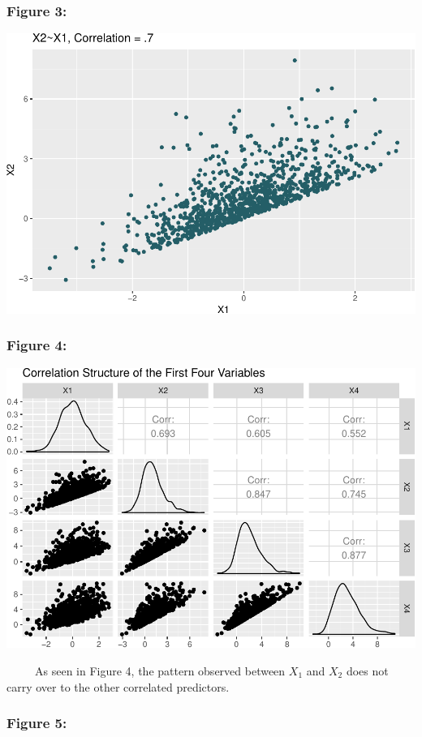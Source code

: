 \documentclass[12pt,twoside]{reedthesis}
\begin{document}
  \subsubsection{Figure 3:}\label{figure-3}
  
  \includegraphics{Thesis_files/figure-latex/fig3-1.pdf}
  
  \subsubsection{Figure 4:}\label{figure-4}
  
  \includegraphics{Thesis_files/figure-latex/fig4-1.pdf}
  
  ~~~~~As seen in Figure 4, the pattern observed between \(X_1\) and
  \(X_2\) does not carry over to the other correlated predictors.
  
  \subsubsection{Figure 5:}\label{figure-5}
  
\end{document}
